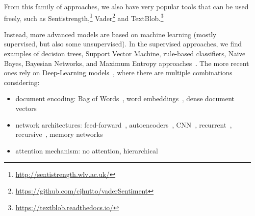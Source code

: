 
From this family of approaches, we also have very popular tools that can be used freely, such as Sentistrength,\footnote{\url{http://sentistrength.wlv.ac.uk/}} Vader\footnote{\url{https://github.com/cjhutto/vaderSentiment}} and TextBlob.\footnote{\url{ https://textblob.readthedocs.io/}}


Instead, more advanced models are based on machine learning (mostly supervised, but also some unsupervised).
In the supervised approaches, we find examples of decision trees, Support Vector Machine, rule-based classifiers, Naive Bayes, Bayesian Networks, and Maximum Entropy approaches~\citep{zharmagambetov2015sentiment,bayhaqy2018sentiment,fitri2019sentiment,rathi2018sentiment,xie2019improved}.
The more recent ones rely on Deep-Learning models~\citep{zhang2018deep}, where there are multiple combinations considering:
\begin{itemize}
    \item document encoding: Bag of Words~\citep{moraes2013document,zhai2016semisupervised}, word embeddings~\citep{tang2015document,chen2016neural}, dense document vectors~\citep{le2014distributed}
    \item network architectures: feed-forward~\citep{duncan2015neural}, autoencoders~\citep{zhai2016semisupervised,wu2019semi}, CNN~\citep{jianqiang2018deep,sun2019aspect}, recurrent~\citep{chen2017recurrent,xu2016cached}, recursive~\citep{wang2016recursive,nguyen2015phrasernn}, memory networks~\citep{li2017end,lv2021aspect}
    \item attention mechanism: no attention, hierarchical~\citep{zhou2016attention} %
\end{itemize}





